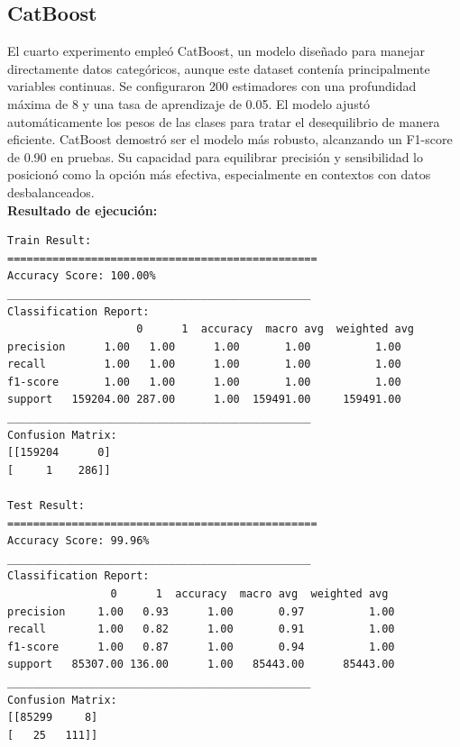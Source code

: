 \documentclass[9pt,a4paper,twoside]{rho-class/rho}
\begin{document}
        \subsection{CatBoost}
            El cuarto experimento empleó CatBoost, un modelo diseñado para manejar directamente datos categóricos, aunque este dataset contenía principalmente variables continuas. Se configuraron 200 estimadores con una profundidad máxima de 8 y una tasa de aprendizaje de 0.05. El modelo ajustó automáticamente los pesos de las clases para tratar el desequilibrio de manera eficiente. CatBoost demostró ser el modelo más robusto, alcanzando un F1-score de 0.90 en pruebas. Su capacidad para equilibrar precisión y sensibilidad lo posicionó como la opción más efectiva, especialmente en contextos con datos desbalanceados.
        \\    
        \textbf{Resultado de ejecución:}\\
\small
\begin{verbatim}
Train Result:
================================================
Accuracy Score: 100.00%
_______________________________________________
Classification Report:
                    0      1  accuracy  macro avg  weighted avg
precision      1.00   1.00      1.00       1.00          1.00
recall         1.00   1.00      1.00       1.00          1.00
f1-score       1.00   1.00      1.00       1.00          1.00
support   159204.00 287.00      1.00  159491.00     159491.00
_______________________________________________
Confusion Matrix: 
[[159204      0]
[     1    286]]

Test Result:
================================================
Accuracy Score: 99.96%
_______________________________________________
Classification Report:
                0      1  accuracy  macro avg  weighted avg
precision     1.00   0.93      1.00       0.97          1.00
recall        1.00   0.82      1.00       0.91          1.00
f1-score      1.00   0.87      1.00       0.94          1.00
support   85307.00 136.00      1.00   85443.00      85443.00
_______________________________________________
Confusion Matrix: 
[[85299     8]
[   25   111]]
\end{verbatim}
\normalsize
\end{document}
